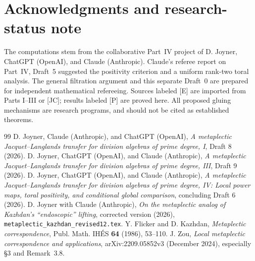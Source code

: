 \documentclass[11pt]{article}
\theoremstyle{plain}
\theoremstyle{definition}
\begin{document}
\section*{Acknowledgments and research-status note}
The computations stem from the collaborative Part~IV project of
D. Joyner, ChatGPT (OpenAI), and Claude (Anthropic).  Claude's
referee report on Part~IV, Draft~5 suggested the positivity
criterion and a uniform rank-two toral analysis.  The general
filtration argument and this separate Draft~0 are prepared for
independent mathematical refereeing.  Sources labeled [E] are
imported from Parts I--III or [JC]; results labeled [P] are
proved here.  All proposed gluing mechanisms are research
programs, and should not be cited as established theorems.
\begin{thebibliography}{99}
 D. Joyner, Claude (Anthropic), and ChatGPT (OpenAI),
\emph{A metaplectic Jacquet--Langlands transfer for division
algebras of prime degree, I}, Draft 8 (2026).
 D. Joyner, ChatGPT (OpenAI), and Claude (Anthropic),
\emph{A metaplectic Jacquet--Langlands transfer for division
algebras of prime degree, III}, Draft 9 (2026).
 D. Joyner, ChatGPT (OpenAI), and Claude (Anthropic),
\emph{A metaplectic Jacquet--Langlands transfer for division
algebras of prime degree, IV: Local power maps, toral positivity,
and conditional global comparison}, concluding Draft 6 (2026).
 D. Joyner with Claude (Anthropic),
\emph{On the metaplectic analog of Kazhdan's ``endoscopic'' lifting},
corrected version (2026), \texttt{metaplectic\_kazhdan\_revised12.tex}.
 Y. Flicker and D. Kazhdan,
\emph{Metaplectic correspondence}, Publ. Math. IH\'ES
\textbf{64} (1986), 53--110.
 J. Zou,
\emph{Local metaplectic correspondence and applications},
arXiv:2209.05852v3 (December 2024), especially \S3 and Remark~3.8.
\end{thebibliography}
\end{document}
